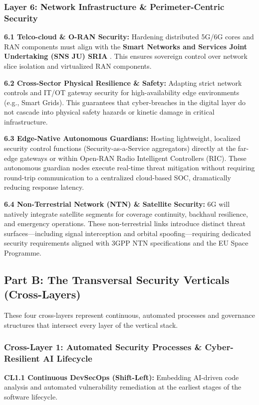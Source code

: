 \documentclass[12pt,a4paper]{report}
\begin{document}
\subsubsection*{Layer 6: Network Infrastructure \& Perimeter-Centric Security}
\textbf{6.1 Telco-cloud \& O-RAN Security:} Hardening distributed 5G/6G cores and RAN components must align with the \textbf{Smart Networks and Services Joint Undertaking (SNS JU) SRIA} \cite{snsju}. This ensures sovereign control over network slice isolation and virtualized RAN components.

\textbf{6.2 Cross-Sector Physical Resilience \& Safety:} Adapting strict network controls and IT/OT gateway security for high-availability edge environments (e.g., Smart Grids). This guarantees that cyber-breaches in the digital layer do not cascade into physical safety hazards or kinetic damage in critical infrastructure.

\textbf{6.3 Edge-Native Autonomous Guardians:} Hosting lightweight, localized security control functions (Security-as-a-Service aggregators) directly at the far-edge gateways or within Open-RAN Radio Intelligent Controllers (RIC). These autonomous guardian nodes execute real-time threat mitigation without requiring round-trip communication to a centralized cloud-based SOC, dramatically reducing response latency.

\textbf{6.4 Non-Terrestrial Network (NTN) \& Satellite Security:} 6G will natively integrate satellite segments for coverage continuity, backhaul resilience, and emergency operations. These non-terrestrial links introduce distinct threat surfaces---including signal interception and orbital spoofing---requiring dedicated security requirements aligned with 3GPP NTN specifications and the EU Space Programme.

\subsection*{Part B: The Transversal Security Verticals (Cross-Layers)}
These four cross-layers represent continuous, automated processes and governance structures that intersect every layer of the vertical stack.

\subsubsection*{Cross-Layer 1: Automated Security Processes \& Cyber-Resilient AI Lifecycle}
\textbf{CL1.1 Continuous DevSecOps (Shift-Left):} Embedding AI-driven code analysis and automated vulnerability remediation at the earliest stages of the software lifecycle.
\end{document}
